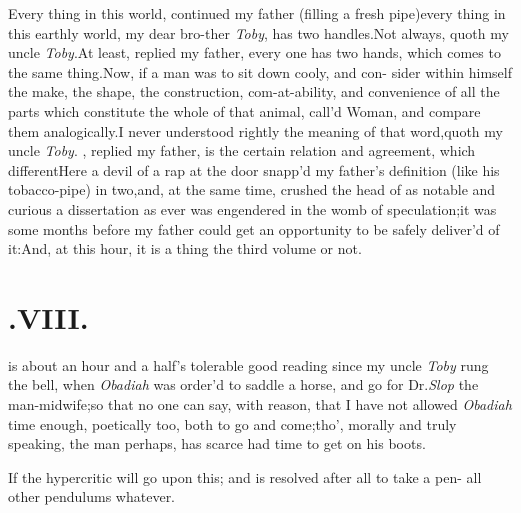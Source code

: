 \documentclass{article}
\begin{document}
Every thing in this world, continued my father (filling a fresh
pipe)\tsk every thing in this earthly world, my dear
bro-\break ther \textit{Toby},
has two handles.\tsk Not always, quoth my uncle
\textit{Toby}.\tsh At least, replied my father, every one
has two hands,\tsk\break
which comes to the same
thing.\tsh Now, if a man was to sit down cooly, and con-\break
sider within himself the make, the shape, the construction,
com-at-ability, and convenience of all the parts which
constitute
the whole of that animal, call’d Woman, and compare them
analogically.\tsk I never understood rightly the meaning of that
word,\tsk quoth my uncle \textit{Toby}.\tsh\break
{}, replied my father, is the certain
relation and agreement, which different\tsh Here a devil of
a rap at the door snapp’d my father’s definition (like his
tobacco-pipe) in two,\tsk and, at the same time, crushed the head
of as notable and curious a dissertation as ever was
engendered in the womb of speculation;\tsk it was some months
before my father could get an opportunity to be safely
deliver’d of
it:\tsk And, at this hour, it is a thing\break
{}
the third volume or not.

\null
\section{.\enspace  VIII.}

 is about an hour and a
half’s tole\-rable good reading since my uncle \textit{Toby} rung
the bell, when \textit{Obadiah} was\break
order’d to saddle a horse, and go for\break 
Dr.\@ \textit{Slop} the man-midwife;\tsk so that no one can say,
with reason, that I have not allowed \textit{Obadiah} time enough,
poetically  too, both to go
and come;\tsh tho’,\break
morally and truly speaking, the man\break
perhaps, has scarce had time to get on\break
his boots.

If the hypercritic will go upon this; and is resolved after all
to take a pen- 
all other pendulums whatever.
\end{document}
